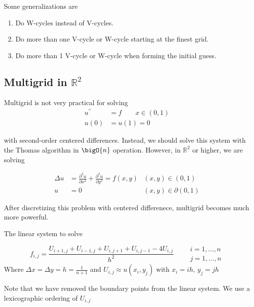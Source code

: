 \hspace{-1cm} 


Some generalizations are
\begin{enumerate}[1)]
\item Do W-cycles instead of V-cycles.
\item Do more than one V-cycle or W-cycle starting at the finest grid.  
\item Do more than 1 V-cycle or W-cycle when forming the initial guess. 
\end{enumerate}

\subsection{Multigrid in $\mathbb{R}^2$}
Multigrid is not very practical for solving
\begin{align*}
  u^{''} &= f \qquad  x\in (0, 1) \\
  u(0)&=u(1)=0
\end{align*}

with second-order centered differences. Instead, we should solve this system
with the Thomas algorithm in $\bigO{n}$ operation. However, in $\mathbb{R}^2$ or
higher, we are solving 

\begin{align*}
  \Delta u &= \frac{\partial^2u}{\partial x^2}  + \frac{\partial^2u}{\partial y^2}  = f(x,y) & (x, y)\in (0, 1)\\
  u&=0& (x, y)\in \partial(0,1)
\end{align*}

After discretizing this problem with centered differenece, multigrid becomes
much more powerful.

The linear system to solve

\begin{equation*}
  f_{i, j} = \frac{
    U_{i+1, j} + U_{i-1, j} + U_{i, j+1} + U_{i, j-1} - 4U_{i, j}
  }{h^2} \qquad\substack{i=1, \ldots, n \\ j=1, \ldots, n}
\end{equation*}
Where $\Delta x=\Delta y=h=\frac{1}{n+1}$ and $U_{i,j}\approx u(x_i, y_j)$ with $x_i=ih,\,y_j=jh$

\begin{center}
    
\end{center}
Note that we have removed the boundary points from the linear system. We use a
lexicographic ordering of $U_{i, j}$

